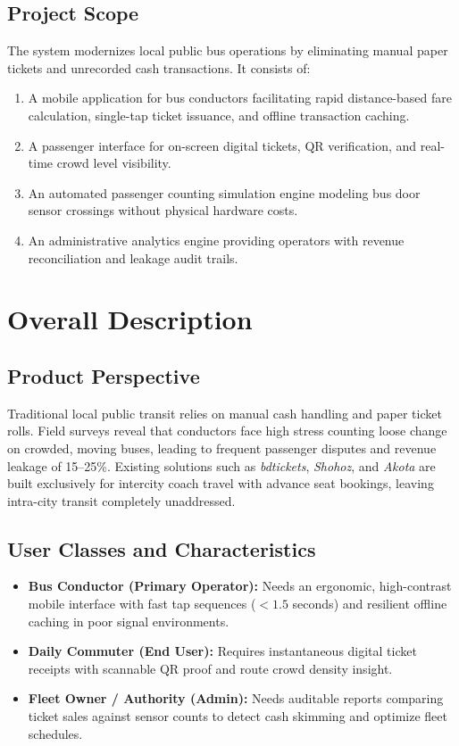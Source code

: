\documentclass[11pt,a4paper]{article}
\begin{document}
\subsection{Project Scope}
The system modernizes local public bus operations by eliminating manual paper tickets and unrecorded cash transactions. It consists of:
\begin{enumerate}[noitemsep]
    \item A mobile application for bus conductors facilitating rapid distance-based fare calculation, single-tap ticket issuance, and offline transaction caching.
    \item A passenger interface for on-screen digital tickets, QR verification, and real-time crowd level visibility.
    \item An automated passenger counting simulation engine modeling bus door sensor crossings without physical hardware costs.
    \item An administrative analytics engine providing operators with revenue reconciliation and leakage audit trails.
\end{enumerate}

\section{Overall Description}

\subsection{Product Perspective}
Traditional local public transit relies on manual cash handling and paper ticket rolls. Field surveys reveal that conductors face high stress counting loose change on crowded, moving buses, leading to frequent passenger disputes and revenue leakage of 15--25\%. Existing solutions such as \textit{bdtickets}, \textit{Shohoz}, and \textit{Akota} are built exclusively for intercity coach travel with advance seat bookings, leaving intra-city transit completely unaddressed.

\subsection{User Classes and Characteristics}
\begin{itemize}
    \item \textbf{Bus Conductor (Primary Operator):} Needs an ergonomic, high-contrast mobile interface with fast tap sequences ($< 1.5$ seconds) and resilient offline caching in poor signal environments.
    \item \textbf{Daily Commuter (End User):} Requires instantaneous digital ticket receipts with scannable QR proof and route crowd density insight.
    \item \textbf{Fleet Owner / Authority (Admin):} Needs auditable reports comparing ticket sales against sensor counts to detect cash skimming and optimize fleet schedules.
\end{itemize}
\end{document}
